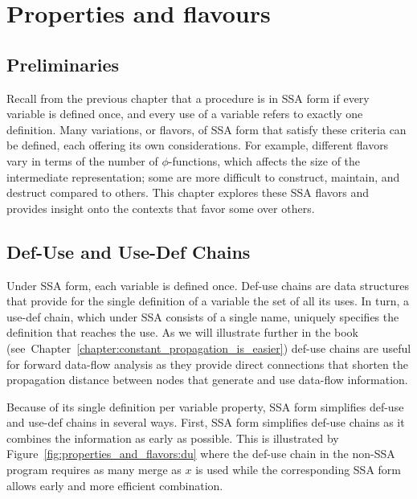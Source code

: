 \chapter{Properties and flavours }
\label{chapter:properties_and_flavours}



\section{Preliminaries}

Recall from the previous chapter that a procedure is in SSA form if every variable is defined once, and every use of a variable refers to exactly one definition. 
Many variations, or flavors, of SSA form that satisfy these criteria can be defined, each offering its own considerations. 
For example, different flavors vary in terms of the number of $\phi$-functions, which affects the size of the intermediate representation; 
some are more difficult to construct, maintain, and destruct compared to others. 
This chapter explores these SSA flavors and provides insight onto the contexts that favor some over others.

\section{Def-Use and Use-Def Chains}
\label{sec:properties_and_flavours:def-use}
Under SSA form, each variable is defined once. 
Def-use chains are data structures that provide for the single definition of a variable the set of all its uses. 
In turn, a use-def chain, which under SSA consists of a single name, uniquely specifies the definition that reaches the use. 
As we will illustrate further in the book (see~Chapter~\ref{chapter:constant_propagation_is_easier}) def-use chains are useful for forward data-flow analysis as they provide direct connections that shorten the propagation distance between nodes that generate and use data-flow information.

Because of its single definition per variable property, SSA form simplifies def-use and use-def chains in several ways. 
First, SSA form simplifies def-use chains as it combines the information as early as possible. 
This is illustrated by Figure~\ref{fig:properties_and_flavors:du} where the def-use chain in the non-SSA program requires as many merge as $x$ is used while the corresponding SSA form allows early and more efficient combination.

